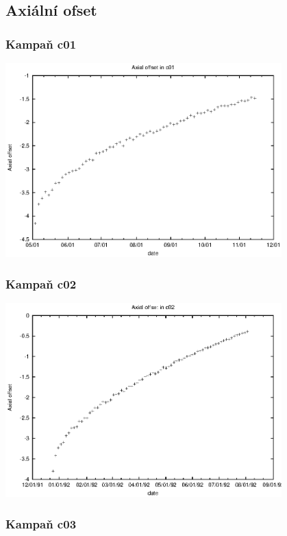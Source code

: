 \documentclass[a4paper,twoside,11pt]{article}
\begin{document}
\subsection{Axiální ofset}



\subsubsection{Kampaň c01}

\includegraphics[width=0.8\textwidth]{data_c01_ao.eps}


\subsubsection{Kampaň c02}

\includegraphics[width=0.8\textwidth]{data_c02_ao.eps}


\subsubsection{Kampaň c03}
\end{document}
